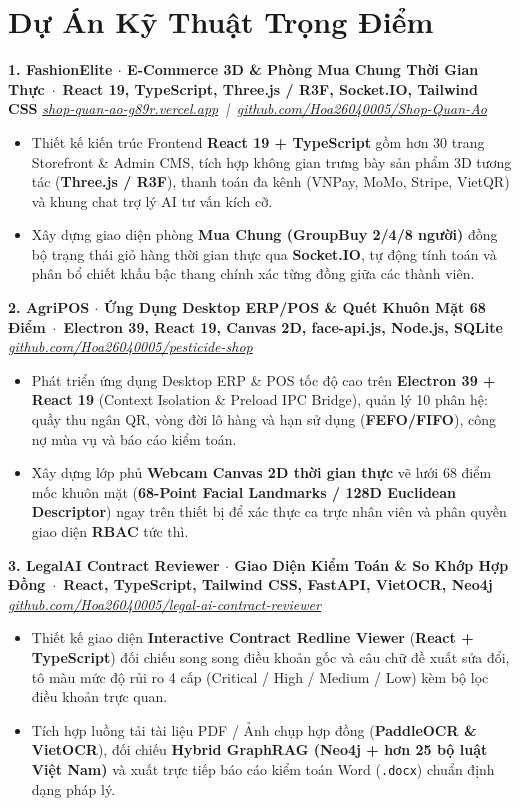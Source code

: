 \documentclass[10pt,a4paper]{article}
\newcommand{\resumeProject}[3]{
  \vspace{2pt}
  \noindent\textbf{#1} \,$\cdot$\, {\footnotesize\textbf{\color{accent}#2}} \hfill {\footnotesize\textit{#3}} \\
}
\begin{document}
\section{Dự Án Kỹ Thuật Trọng Điểm}

\resumeProject{1. FashionElite $\cdot$ E-Commerce 3D \& Phòng Mua Chung Thời Gian Thực}{React 19, TypeScript, Three.js / R3F, Socket.IO, Tailwind CSS}{\href{https://shop-quan-ao-g89r.vercel.app}{shop-quan-ao-g89r.vercel.app} \,|\, \href{https://github.com/Hoa26040005/Shop-Quan-Ao}{github.com/Hoa26040005/Shop-Quan-Ao}}
{\footnotesize
\begin{itemize}
  \item Thiết kế kiến trúc Frontend \textbf{React 19 + TypeScript} gồm hơn 30 trang Storefront \& Admin CMS, tích hợp không gian trưng bày sản phẩm 3D tương tác (\textbf{Three.js / R3F}), thanh toán đa kênh (VNPay, MoMo, Stripe, VietQR) và khung chat trợ lý AI tư vấn kích cỡ.
  \item Xây dựng giao diện phòng \textbf{Mua Chung (GroupBuy 2/4/8 người)} đồng bộ trạng thái giỏ hàng thời gian thực qua \textbf{Socket.IO}, tự động tính toán và phân bổ chiết khấu bậc thang chính xác từng đồng giữa các thành viên.
\end{itemize}
}

\resumeProject{2. AgriPOS $\cdot$ Ứng Dụng Desktop ERP/POS \& Quét Khuôn Mặt 68 Điểm}{Electron 39, React 19, Canvas 2D, face-api.js, Node.js, SQLite}{\href{https://github.com/Hoa26040005/pesticide-shop}{github.com/Hoa26040005/pesticide-shop}}
{\footnotesize
\begin{itemize}
  \item Phát triển ứng dụng Desktop ERP \& POS tốc độ cao trên \textbf{Electron 39 + React 19} (Context Isolation \& Preload IPC Bridge), quản lý 10 phân hệ: quầy thu ngân QR, vòng đời lô hàng và hạn sử dụng (\textbf{FEFO/FIFO}), công nợ mùa vụ và báo cáo kiểm toán.
  \item Xây dựng lớp phủ \textbf{Webcam Canvas 2D thời gian thực} vẽ lưới 68 điểm mốc khuôn mặt (\textbf{68-Point Facial Landmarks / 128D Euclidean Descriptor}) ngay trên thiết bị để xác thực ca trực nhân viên và phân quyền giao diện \textbf{RBAC} tức thì.
\end{itemize}
}

\resumeProject{3. LegalAI Contract Reviewer $\cdot$ Giao Diện Kiểm Toán \& So Khớp Hợp Đồng}{React, TypeScript, Tailwind CSS, FastAPI, VietOCR, Neo4j}{\href{https://github.com/Hoa26040005/legal-ai-contract-reviewer}{github.com/Hoa26040005/legal-ai-contract-reviewer}}
{\footnotesize
\begin{itemize}
  \item Thiết kế giao diện \textbf{Interactive Contract Redline Viewer} (\textbf{React + TypeScript}) đối chiếu song song điều khoản gốc và câu chữ đề xuất sửa đổi, tô màu mức độ rủi ro 4 cấp (Critical / High / Medium / Low) kèm bộ lọc điều khoản trực quan.
  \item Tích hợp luồng tải tài liệu PDF / Ảnh chụp hợp đồng (\textbf{PaddleOCR \& VietOCR}), đối chiếu \textbf{Hybrid GraphRAG (Neo4j + hơn 25 bộ luật Việt Nam)} và xuất trực tiếp báo cáo kiểm toán Word (\texttt{.docx}) chuẩn định dạng pháp lý.
\end{itemize}
}
\end{document}
